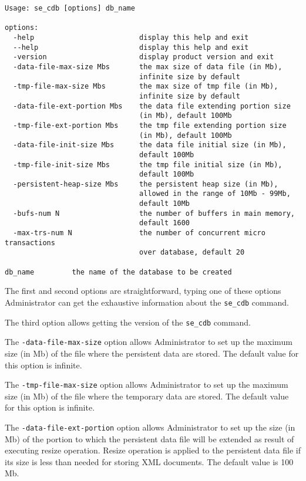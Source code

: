 \documentclass[a4paper,12pt]{article}
\begin{document}
\begin{verbatim}
Usage: se_cdb [options] db_name

options:
  -help                         display this help and exit
  --help                        display this help and exit
  -version                      display product version and exit
  -data-file-max-size Mbs       the max size of data file (in Mb),
                                infinite size by default
  -tmp-file-max-size Mbs        the max size of tmp file (in Mb),
                                infinite size by default
  -data-file-ext-portion Mbs    the data file extending portion size 
                                (in Mb), default 100Mb
  -tmp-file-ext-portion Mbs     the tmp file extending portion size
                                (in Mb), default 100Mb
  -data-file-init-size Mbs      the data file initial size (in Mb),
                                default 100Mb
  -tmp-file-init-size Mbs       the tmp file initial size (in Mb),
                                default 100Mb
  -persistent-heap-size Mbs     the persistent heap size (in Mb),
                                allowed in the range of 10Mb - 99Mb,
                                default 10Mb
  -bufs-num N                   the number of buffers in main memory,
                                default 1600
  -max-trs-num N                the number of concurrent micro transactions
                                over database, default 20

db_name         the name of the database to be created
\end{verbatim}


The first and second options are straightforward, typing one of these options Administrator can get the exhaustive information about the \verb!se_cdb! command.

The third option allows getting the version of the \verb!se_cdb! command.

The \verb!-data-file-max-size! option allows Administrator to set up the maximum size (in Mb) of the file where the persistent data are stored. The default value for this option is infinite.

The \verb!-tmp-file-max-size! option allows Administrator to set up the maximum size (in Mb) of the file where the temporary data are stored. The default value for this option is infinite.

The \verb!-data-file-ext-portion! option allows Administrator to set up the size (in Mb) of the portion to which the persistent data file will be extended as result of executing resize operation. Resize operation is applied to the persistent data file if its size is less than needed for storing XML documents. The default value is 100 Mb.
\end{document}
